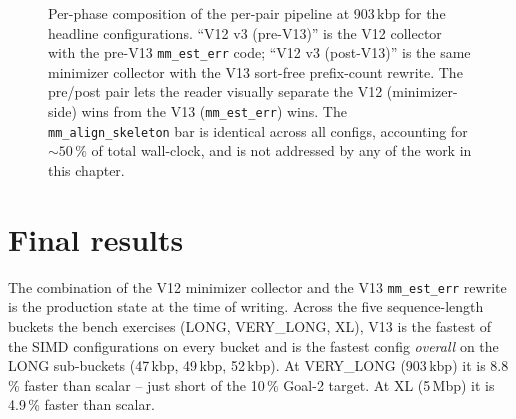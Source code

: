 \begin{figure}[ht]
\begin{CacheMeCode}{python, custom include command={}}, set placeholder eval={__LINEWIDTH__}{\lenToCmNoUnit[in]{\linewidth}}}
  \end{CacheMeCode}
  \caption{Per-phase composition of the per-pair pipeline at
    903\,kbp for the headline configurations.  ``V12 v3 (pre-V13)''
    is the V12 collector with the pre-V13 \texttt{mm\_est\_err}
    code; ``V12 v3 (post-V13)'' is the same minimizer collector with
    the V13 sort-free prefix-count rewrite.  The pre/post pair lets
    the reader visually separate the V12 (minimizer-side) wins from
    the V13 (\texttt{mm\_est\_err}) wins.  The \texttt{mm\_align\_skeleton}
    bar is identical across all configs, accounting for $\sim 50\,\%$
    of total wall-clock, and is not addressed by any of the work in
    this chapter.}
  \label{fig:phase-stack-v13}
\end{figure}

\section{Final results}
\label{sec:final-results}

The combination of the V12 minimizer collector and the V13
\texttt{mm\_est\_err} rewrite is the production state at the time of
writing.  Across the five sequence-length buckets the bench
exercises (LONG, VERY\_LONG, XL), V13 is the fastest of the SIMD
configurations on every bucket and is the fastest config
\emph{overall} on the LONG sub-buckets (47\,kbp, 49\,kbp, 52\,kbp).
At VERY\_LONG (903\,kbp) it is 8.8\,\% faster than scalar -- just
short of the 10\,\% Goal-2 target.  At XL (5\,Mbp) it is 4.9\,\%
faster than scalar.

